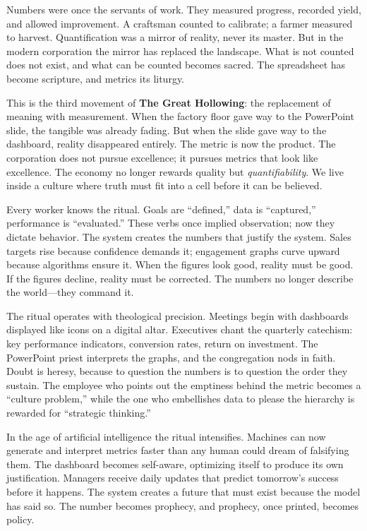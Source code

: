 \documentclass[11pt,twoside]{book}
\begin{document}
Numbers were once the servants of work.  They measured progress, recorded yield, and allowed improvement.  A craftsman counted to calibrate; a farmer measured to harvest.  Quantification was a mirror of reality, never its master.  But in the modern corporation the mirror has replaced the landscape.  What is not counted does not exist, and what can be counted becomes sacred.  The spreadsheet has become scripture, and metrics its liturgy.

This is the third movement of \textbf{The Great Hollowing}: the replacement of meaning with measurement.  When the factory floor gave way to the PowerPoint slide, the tangible was already fading.  But when the slide gave way to the dashboard, reality disappeared entirely.  The metric is now the product.  The corporation does not pursue excellence; it pursues metrics that look like excellence.  The economy no longer rewards quality but \emph{quantifiability}.  We live inside a culture where truth must fit into a cell before it can be believed.

Every worker knows the ritual.  Goals are “defined,” data is “captured,” performance is “evaluated.”  These verbs once implied observation; now they dictate behavior.  The system creates the numbers that justify the system.  Sales targets rise because confidence demands it; engagement graphs curve upward because algorithms ensure it.  When the figures look good, reality must be good.  If the figures decline, reality must be corrected.  The numbers no longer describe the world—they command it.

The ritual operates with theological precision.  Meetings begin with dashboards displayed like icons on a digital altar.  Executives chant the quarterly catechism: key performance indicators, conversion rates, return on investment.  The PowerPoint priest interprets the graphs, and the congregation nods in faith.  Doubt is heresy, because to question the numbers is to question the order they sustain.  The employee who points out the emptiness behind the metric becomes a “culture problem,” while the one who embellishes data to please the hierarchy is rewarded for “strategic thinking.”

In the age of artificial intelligence the ritual intensifies.  Machines can now generate and interpret metrics faster than any human could dream of falsifying them.  The dashboard becomes self-aware, optimizing itself to produce its own justification.  Managers receive daily updates that predict tomorrow’s success before it happens.  The system creates a future that must exist because the model has said so.  The number becomes prophecy, and prophecy, once printed, becomes policy.
\end{document}
